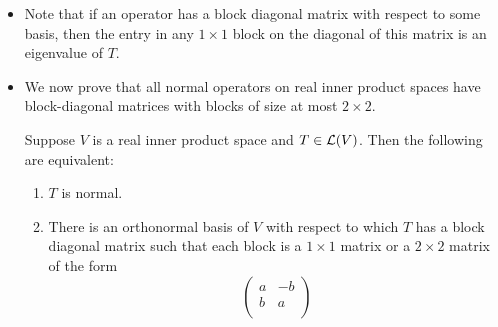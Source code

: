 \documentclass[../main.tex]{subfiles}
\begin{document}
\begin{itemize}
\begin{theorem}
\begin{enumerate}[label={\textup{(}\alph*\textup{)}}]
            \item $(T|_U)^*=(T^*)|_U$.
            \begin{proof}
                For every $u,v\in U$, we have that
                \begin{equation*}
                    \inp{u}{(T|_U)^*v} = \inp{(T|_U)u}{v} = \inp{Tu}{v} = \inp{u}{T^*v} = \inp{u}{((T^*)|_U)v}
                \end{equation*}
                Therefore, $(T|_U)^*=(T^*)|_U$, as desired.
            \end{proof}
            \item $T|_U\in\ope{U}$ and $T|_{U^\perp}\in\ope{U^\perp}$ are normal operators.
            \begin{proof}
                We have from the above results that
                \begin{equation*}
                    (T|_U)(T|_U)^* = T|_U(T^*)|_U
                    = (TT^*)|_U
                    = (T^*T)|_U
                    = (T^*)|_UT|_U
                    = (T|_U)^*(T|_U)
                \end{equation*}
                and similarly for $U^\perp$.
            \end{proof}
        \end{enumerate}
    \end{theorem}
    \item Note that if an operator has a block diagonal matrix with respect to some basis, then the entry in any $1\times 1$ block on the diagonal of this matrix is an eigenvalue of $T$.
    \item We now prove that all normal operators on real inner product spaces have block-diagonal matrices with blocks of size at most $2\times 2$.
    \begin{theorem}
        Suppose $V$ is a real inner product space and $T\in\mathcal{L}(V)$. Then the following are equivalent:
        \begin{enumerate}[label={\textup{(}\alph*\textup{)}}]
            \item $T$ is normal.
            \item There is an orthonormal basis of $V$ with respect to which $T$ has a block diagonal matrix such that each block is a $1\times 1$ matrix or a $2\times 2$ matrix of the form
            \begin{equation*}
                \begin{pmatrix}
                    a & -b\\
                    b & a\\

\end{pmatrix}
\end{equation*}
\end{enumerate}
\end{theorem}
\end{itemize}
\end{document}
